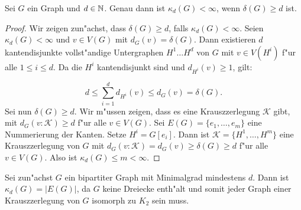 \begin{lemma}
  Sei $G$ ein Graph und $d\in {\mathbb{N}}$. Genau dann ist $\kappa_{d}(G) < \infty$, wenn $\delta(G) \geq d$ ist. \label{lm:krauszexistenz}
\end{lemma}

\begin{proof}
  Wir zeigen zun"achst, dass $\delta(G) \geq d$, falls $\kappa_d(G) < \infty$. Seien $\kappa_d(G) <\infty$ und $v\in V(G)$ mit $d_{G}(v) = \delta(G)$. Dann existieren $d$ kantendisjunkte vollst"andige Untergraphen $H^{1}\dots H^{d}$ von $G$ mit $v\in V(H^{i})$ f"ur alle $1\leq i \leq d$. Da die $H^{i}$ kantendisjunkt sind und $d_{H^{i}}(v)\geq1$, gilt: 

  \[
    d \leq \sum\limits_{i=1}^{d} d_{H^{i}}(v) \leq d_G(v) = \delta(G). 
  \]
  Sei nun $\delta(G) \geq d$. Wir m"ussen zeigen, dass es eine Krauszzerlegung $\mathcal{K}$ gibt, mit $d_{G}(v:\mathcal{K}) \geq d$ f"ur alle $v\in V(G)$. Sei $E(G)= \{e_1,\dots, e_{m}\}$ eine Nummerierung der Kanten. Setze $H^{i}= G[e_i]$. Dann ist $\mathcal{K} = \{H^{1},\dots, H^{m}\}$ eine Krauszzerlegung von $G$ mit $d_{G}(v:\mathcal{K}) = d_{G}(v) \geq \delta(G) \geq d$ f"ur alle $v\in V(G)$. Also ist $\kappa_d(G)\leq m <\infty$.

\end{proof}

\begin{example}
  Sei zun"achst $G$ ein bipartiter Graph mit Minimalgrad mindestens $d$. Dann ist $\kappa_{d}(G) = |E(G)|$, da $G$ keine Dreiecke enth"alt und somit jeder Graph einer Krauszzerlegung von $G$ isomorph zu $K_{2}$ sein muss. 
\end{example}

